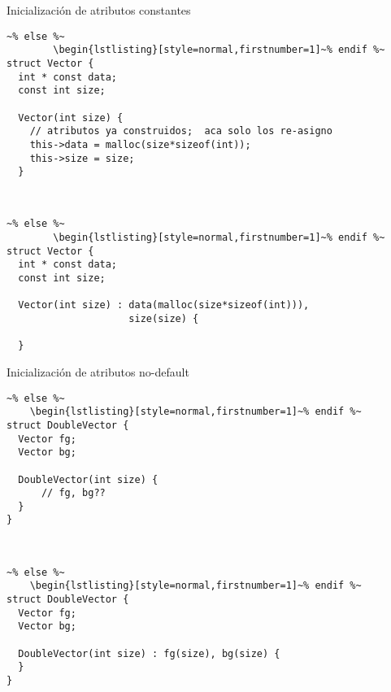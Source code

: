 \begin{frame}[fragile]{Inicializaci\'on de atributos constantes}
                   ~%
        \begin{lstlisting}[style=normal,firstnumber=1,linebackgroundcolor={%
                 \btLstHLR<1>{2,7}%
                 \btLstHLR<2>{3,8}%
         }]~% else %~
        \begin{lstlisting}[style=normal,firstnumber=1]~% endif %~
struct Vector {
  int * const data;
  const int size;

  Vector(int size) {
    // atributos ya construidos;  aca solo los re-asigno
    this->data = malloc(size*sizeof(int));
    this->size = size;
  }
        \end{lstlisting}
        \pause
        \pause
                   ~%
        \begin{lstlisting}[style=normal,firstnumber=1,linebackgroundcolor={%
                 \btLstHLB<3>{2,5}%
                 \btLstHLB<4>{3,6}%
         }]~% else %~
        \begin{lstlisting}[style=normal,firstnumber=1]~% endif %~
struct Vector {
  int * const data;
  const int size;

  Vector(int size) : data(malloc(size*sizeof(int))),
                     size(size) {

  }
        \end{lstlisting}
\end{frame}

\begin{frame}[fragile]{Inicializaci\'on de atributos no-default}
                   ~%
    \begin{lstlisting}[style=normal,firstnumber=1,linebackgroundcolor={%
                 \btLstHLR<1>{5}%
         }]~% else %~
    \begin{lstlisting}[style=normal,firstnumber=1]~% endif %~
struct DoubleVector {
  Vector fg;
  Vector bg;

  DoubleVector(int size) {
      // fg, bg??
  }
}
        \end{lstlisting}
        \pause
                   ~%
    \begin{lstlisting}[style=normal,firstnumber=1,linebackgroundcolor={%
                 \btLstHLB<2>{5}%
         }]~% else %~
    \begin{lstlisting}[style=normal,firstnumber=1]~% endif %~
struct DoubleVector {
  Vector fg;
  Vector bg;

  DoubleVector(int size) : fg(size), bg(size) {
  }
}
        \end{lstlisting}
\end{frame}

